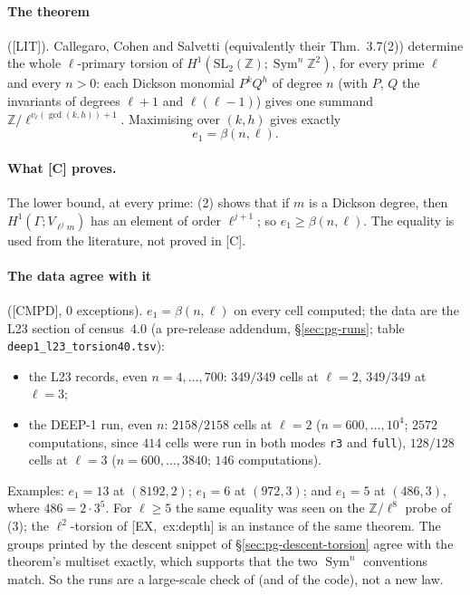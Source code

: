 \documentclass[11pt]{article}
\newcommand{\Z}{\mathbb{Z}}
\newcommand{\Sym}{\operatorname{Sym}}
\newcommand{\SL}{\mathrm{SL}}
\newcommand{\Ga}{\Gamma}
\newcommand{\code}[1]{\texttt{#1}}
\newcommand{\pfile}[1]{\nolinkurl{#1}}
\newcommand{\LIT}{\textsf{\small[LIT]}}
\newcommand{\CMPD}{\textsf{\small[CMPD]}}
\begin{document}
\paragraph{The theorem} (\LIT). Callegaro, Cohen and Salvetti \cite[Thm.~4.5]{ph_ccs13} (equivalently their Thm.~3.7(2)) determine the whole
$\ell$-primary torsion of $H^{1}(\SL_2(\Z);\Sym^{n}\Z^{2})$, for every prime $\ell$ and every $n>0$: each Dickson monomial $P^{k}Q^{h}$ of degree
$n$ (with $P$, $Q$ the invariants of degrees $\ell+1$ and $\ell(\ell-1)$) gives one summand $\Z/\ell^{v_\ell(\gcd(k,h))+1}$. Maximising over
$(k,h)$ gives exactly
\[
  e_1=\beta(n,\ell).
\]

\paragraph{What [C] proves.} The lower bound, at every prime: {}(2) shows that if $m$ is a Dickson degree, then
$H^{1}(\Ga;V_{\ell^{j}m})$ has an element of order $\ell^{j+1}$; so $e_1\ge\beta(n,\ell)$. The equality is used from the literature, not proved
in [C].

\paragraph{The data agree with it} (\CMPD, $0$ exceptions). $e_1=\beta(n,\ell)$ on every cell computed; the data are the L23 section of
census~4.0 (a pre-release addendum, \S\ref{sec:pg-runs}; table \pfile{deep1_l23_torsion40.tsv}):
\begin{itemize}[leftmargin=1.6em,itemsep=1pt]
\item the L23 records, even $n=4,\dots,700$: $349/349$ cells at $\ell=2$, $349/349$ at $\ell=3$;
\item the DEEP-1 run, even $n$: $2158/2158$ cells at $\ell=2$ ($n=600,\dots,10^{4}$; $2572$ computations, since $414$ cells were run in
  both modes \code{r3} and \code{full}), $128/128$ cells at $\ell=3$ ($n=600,\dots,3840$; $146$ computations).
\end{itemize}
Examples: $e_1=13$ at $(8192,2)$; $e_1=6$ at $(972,3)$; and $e_1=5$ at $(486,3)$, where $486=2\cdot3^{5}$. For $\ell\ge5$ the same equality
was seen on the $\Z/\ell^{8}$ probe of {}(3); the $\ell^{2}$-torsion of [EX,~ex:depth] is an instance of the same
theorem. The groups printed by the descent snippet of \S\ref{sec:pg-descent-torsion} agree with the theorem's multiset exactly, which supports
that the two $\Sym^{n}$ conventions match. So the runs are a large-scale check of \cite{ph_ccs13} (and of the code), not a new law.
\end{document}
